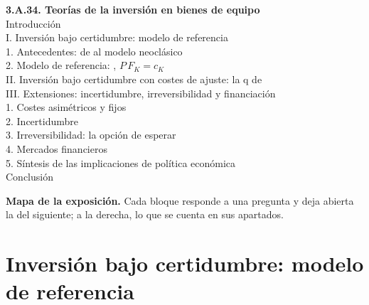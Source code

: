 \documentclass[11pt]{article}
\begin{document}
\begin{esquema}
\textbf{3.A.34. Teorías de la inversión en bienes de equipo}\\[2pt]
Introducción\\
I. Inversión bajo certidumbre: modelo de referencia\\
\hspace*{1.5em}1. Antecedentes: de  al modelo neoclásico\\
\hspace*{1.5em}2. Modelo de referencia: , $P\,F_K=c_K$\\
II. Inversión bajo certidumbre con costes de ajuste: la q de \\
III. Extensiones: incertidumbre, irreversibilidad y financiación\\
\hspace*{1.5em}1. Costes asimétricos y fijos\\
\hspace*{1.5em}2. Incertidumbre\\
\hspace*{1.5em}3. Irreversibilidad: la opción de esperar\\
\hspace*{1.5em}4. Mercados financieros\\
\hspace*{1.5em}5. Síntesis de las implicaciones de política económica\\
Conclusión
\end{esquema}

\begin{anotaciones}
\textbf{Mapa de la exposición.} Cada bloque responde a una pregunta y deja abierta la del siguiente; a la derecha, lo que se cuenta en sus apartados.
\begin{infografiacaja}
\caption{Mapa de la exposición: la pregunta de cada bloque y el hilo que los une}\label{figu:mapa-tema}
\end{infografiacaja}
\end{anotaciones}



\section{Inversión bajo certidumbre: modelo de referencia}\label{sec:certidumbre}
\end{document}
